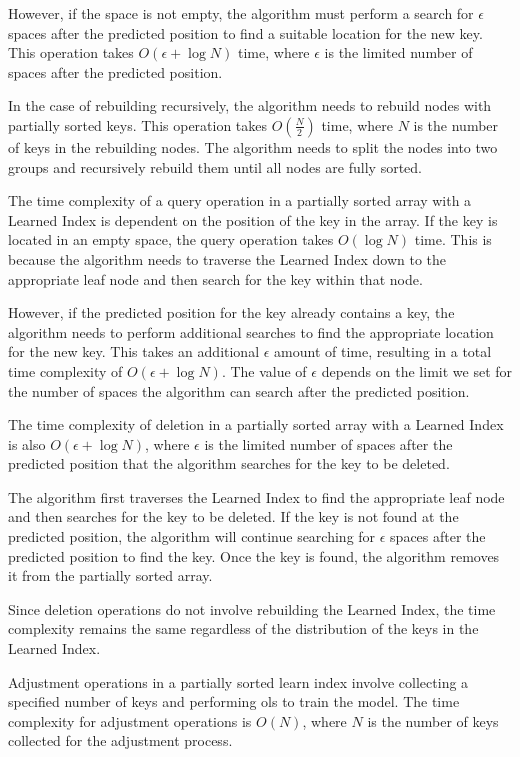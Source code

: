 \documentclass[11pt,a4paper]{article}
\newcommand{\learnindex}{\textsf{Learned Index}\xspace}
\begin{document}
However, if the space is not empty, the algorithm must perform a search for $\epsilon$ spaces after the predicted position to find a suitable location for the new key. This operation takes $O(\epsilon + \log N)$ time, where $\epsilon$ is the limited number of spaces after the predicted position.

In the case of rebuilding recursively, the algorithm needs to rebuild nodes with partially sorted keys. This operation takes $O(\frac{N}{2})$ time, where $N$ is the number of keys in the rebuilding nodes. The algorithm needs to split the nodes into two groups and recursively rebuild them until all nodes are fully sorted.

The time complexity of a query operation in a partially sorted array with a \learnindex is dependent on the position of the key in the array. If the key is located in an empty space, the query operation takes $O(\log N)$ time. This is because the algorithm needs to traverse the \learnindex down to the appropriate leaf node and then search for the key within that node.

However, if the predicted position for the key already contains a key, the algorithm needs to perform additional searches to find the appropriate location for the new key. This takes an additional $\epsilon$ amount of time, resulting in a total time complexity of $O(\epsilon + \log N)$. The value of $\epsilon$ depends on the limit we set for the number of spaces the algorithm can search after the predicted position. 

The time complexity of deletion in a partially sorted array with a \learnindex is also $O(\epsilon + \log N)$, where $\epsilon$ is the limited number of spaces after the predicted position that the algorithm searches for the key to be deleted.

The algorithm first traverses the \learnindex to find the appropriate leaf node and then searches for the key to be deleted. If the key is not found at the predicted position, the algorithm will continue searching for $\epsilon$ spaces after the predicted position to find the key. Once the key is found, the algorithm removes it from the partially sorted array.

Since deletion operations do not involve rebuilding the \learnindex, the time complexity remains the same regardless of the distribution of the keys in the \learnindex.

Adjustment operations in a partially sorted learn index involve collecting a specified number of keys and performing \acrshort{ols} to train the model. The time complexity for adjustment operations is $O(N)$, where $N$ is the number of keys collected for the adjustment process.
\end{document}
